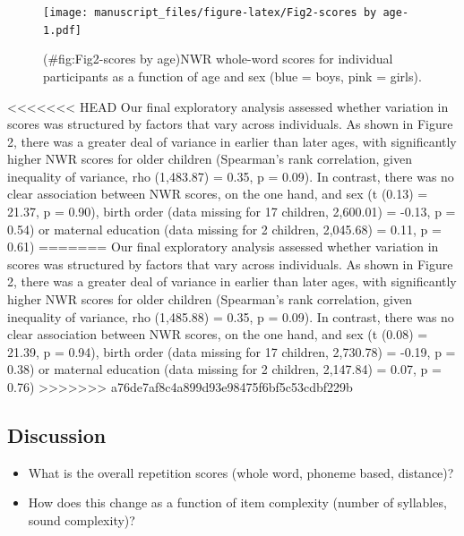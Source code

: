 \documentclass[english,,man,floatsintext]{apa6}
\begin{document}
\begin{figure}
\centering
\texttt{[image: manuscript\_files/figure-latex/Fig2-scores by age-1.pdf]}
\caption{(\#fig:Fig2-scores by age)NWR whole-word scores for individual
participants as a function of age and sex (blue = boys, pink = girls).}
\end{figure}

<<<<<<< HEAD
Our final exploratory analysis assessed whether variation in scores was structured by factors that vary across individuals. As shown in Figure 2, there was a greater deal of variance in earlier than later ages, with significantly higher NWR scores for older children (Spearman's rank correlation, given inequality of variance, rho (1,483.87) = 0.35, p = 0.09). In contrast, there was no clear association between NWR scores, on the one hand, and sex (t (0.13) = 21.37, p = 0.90), birth order (data missing for 17 children, 2,600.01) = -0.13, p = 0.54) or maternal education (data missing for 2 children, 2,045.68) = 0.11, p = 0.61)
=======
Our final exploratory analysis assessed whether variation in scores was
structured by factors that vary across individuals. As shown in Figure
2, there was a greater deal of variance in earlier than later ages, with
significantly higher NWR scores for older children (Spearman's rank
correlation, given inequality of variance, rho (1,485.88) = 0.35, p =
0.09). In contrast, there was no clear association between NWR scores,
on the one hand, and sex (t (0.08) = 21.39, p = 0.94), birth order (data
missing for 17 children, 2,730.78) = -0.19, p = 0.38) or maternal
education (data missing for 2 children, 2,147.84) = 0.07, p = 0.76)
>>>>>>> a76de7af8c4a899d93e98475f6bf5c53cdbf229b

\subsection{Discussion}\label{discussion}

\begin{itemize}
\item
  What is the overall repetition scores (whole word, phoneme based,
  distance)?
\item
  How does this change as a function of item complexity (number of
  syllables, sound complexity)?
\end{itemize}
\end{document}
